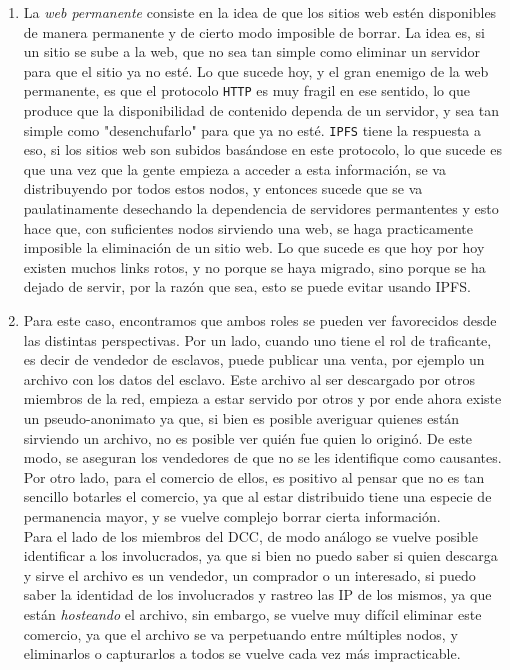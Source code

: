\documentclass[letterpaper,10pt]{article}
\begin{document}
\begin{enumerate}
\item La \textit{web permanente} consiste en la idea de que los sitios web estén disponibles de manera permanente y de cierto modo imposible de borrar. La idea es, si un sitio se sube a la web, que no sea tan simple como eliminar un servidor para que el sitio ya no esté. Lo que sucede hoy, y el gran enemigo de la web permanente, es que el protocolo \texttt{HTTP} es muy fragil en ese sentido, lo que produce que la disponibilidad de contenido dependa de un servidor, y sea tan simple como "desenchufarlo" para que ya no esté. \texttt{IPFS} tiene la respuesta a eso, si los sitios web son subidos basándose en este protocolo, lo que sucede es que una vez que la gente empieza a acceder a esta información, se va distribuyendo por todos estos nodos, y entonces sucede que se va paulatinamente desechando la dependencia de servidores permantentes y esto hace que, con suficientes nodos sirviendo una web, se haga practicamente imposible la eliminación de un sitio web. Lo que sucede es que hoy por hoy existen muchos links rotos, y no porque se haya migrado, sino porque se ha dejado de servir, por la razón que sea, esto se puede evitar usando IPFS.

\item Para este caso, encontramos que ambos roles se pueden ver favorecidos desde las distintas perspectivas. Por un lado, cuando uno tiene el rol de traficante, es decir de vendedor de esclavos, puede publicar una venta, por ejemplo un archivo con los datos del esclavo. Este archivo al ser descargado por otros miembros de la red, empieza a estar servido por otros y por ende ahora existe un pseudo-anonimato ya que, si bien es posible averiguar quienes están sirviendo un archivo, no es posible ver quién fue quien lo originó. De este modo, se aseguran los vendedores de que no se les identifique como causantes. Por otro lado, para el comercio de ellos, es positivo al pensar que no es tan sencillo botarles el comercio, ya que al estar distribuido tiene una especie de permanencia mayor, y se vuelve complejo borrar cierta información.\\

Para el lado de los miembros del DCC, de modo análogo se vuelve posible identificar a los involucrados, ya que si bien no puedo saber si quien descarga y sirve el archivo es un vendedor, un comprador o un interesado, si puedo saber la identidad de los involucrados y rastreo las IP de los mismos, ya que están \textit{hosteando} el archivo, sin embargo, se vuelve muy difícil eliminar este comercio, ya que el archivo se va perpetuando entre múltiples nodos, y eliminarlos o capturarlos a todos se vuelve cada vez más impracticable. 


\end{enumerate}
\end{document}
